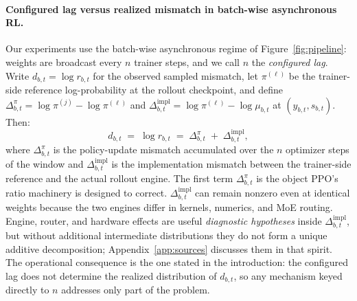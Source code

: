 \paragraph{Configured lag versus realized mismatch in batch-wise asynchronous RL.}
Our experiments use the batch-wise asynchronous regime of Figure~\ref{fig:pipeline}: weights are broadcast every $n$ trainer steps, and we call $n$ the \emph{configured lag}. Write $d_{b,t}=\log r_{b,t}$ for the observed sampled mismatch, let $\pi^{(\ell)}$ be the trainer-side reference log-probability at the rollout checkpoint, and define $\Delta_{b,t}^{\pi}=\log\pi^{(j)}-\log\pi^{(\ell)}$ and $\Delta_{b,t}^{\mathrm{impl}}=\log\pi^{(\ell)}-\log\mu_{b,t}$ at $(y_{b,t},s_{b,t})$. Then:
\begin{equation}
d_{b,t}
\;=\;\log r_{b,t}
\;=\;\Delta_{b,t}^{\pi}
\;+
\;\Delta_{b,t}^{\mathrm{impl}},
\label{eq:split}
\end{equation}
where $\Delta_{b,t}^{\pi}$ is the policy-update mismatch accumulated over the $n$ optimizer steps of the window and $\Delta_{b,t}^{\mathrm{impl}}$ is the implementation mismatch between the trainer-side reference and the actual rollout engine. The first term $\Delta_{b,t}^{\pi}$ is the object PPO's ratio machinery is designed to correct. 
$\Delta_{b,t}^{\mathrm{impl}}$ can remain nonzero even at identical weights because the two engines differ in kernels, numerics, and MoE routing. Engine, router, and hardware effects are useful \emph{diagnostic hypotheses} inside $\Delta_{b,t}^{\mathrm{impl}}$, but without additional intermediate distributions they do not form a unique additive decomposition; Appendix~\ref{app:sources} discusses them in that spirit. The operational consequence is the one stated in the introduction: the configured lag does not determine the realized distribution of $d_{b,t}$, so any mechanism keyed directly to $n$ addresses only part of the problem.




